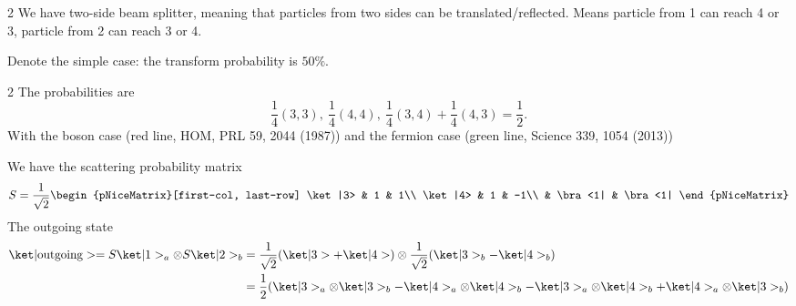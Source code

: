 \begin{paracol}{2}
We have two-side beam splitter, meaning that particles from two sides can be
translated/reflected.  
Means particle from 1 can reach 4 or 3, particle from 2 can reach 3 or 4.

Denote the simple case: the transform probability is $50\%$.
\switchcolumn \centering
{}
\end{paracol}
\begin{paracol}{2}
The probabilities are
\[
  \frac14(3,3),\ \frac14(4,4),\ \frac14(3,4) + \frac14(4,3) = \frac12.
\]
With the boson case (red line, HOM, PRL 59, 2044 (1987)) and the fermion case
(green line, Science 339, 1054 (2013))
\switchcolumn \centering
{}
\end{paracol}
We have the scattering probability matrix
\[
  S = \frac1{\sqrt2}
  \begin{pNiceMatrix}[first-col, last-row]
    \ket|3> & 1 & 1\\
    \ket|4> & 1 & -1\\
    & \bra<1| & \bra<1|
  \end{pNiceMatrix}
\]
The outgoing state
\begin{align*}
  \ket|\text{outgoing}> = S\ket|1>_a \otimes S\ket|2>_b &
= \frac1{\sqrt2}(\ket|3> + \ket|4>) \otimes
  \frac1{\sqrt2}(\ket|3>_b - \ket|4>_b)\\
& = \frac12 (
    \ket|3>_a \otimes \ket|3>_b - \ket|4>_a \otimes \ket|4>_b
  - \ket|3>_a \otimes \ket|4>_b + \ket|4>_a \otimes \ket|3>_b)
\end{align*}
